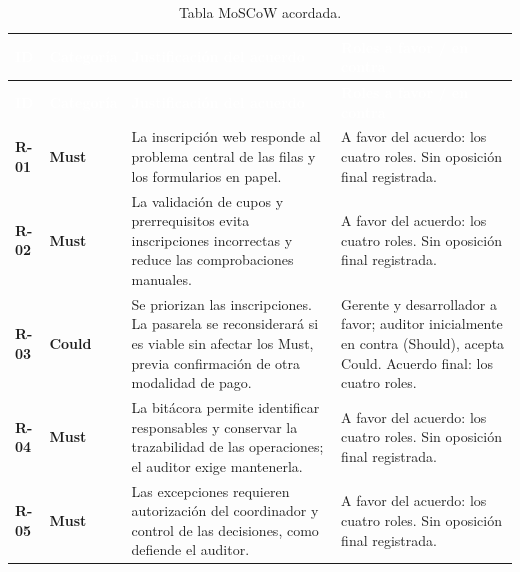 \documentclass[12pt,a4paper]{article}
\newcommand{\cabecera}[1]{
    \textcolor{white}{\textbf{#1}}
}
\begin{document}
\begingroup

\small
\singlespacing
\setlength{\tabcolsep}{4pt}

\begin{longtable}{
    C{1.1cm}
    C{2.0cm}
    L{6.7cm}
    L{4.0cm}
}

\caption{Tabla MoSCoW acordada.}
\label{tab:moscow}\\

\cabecera{ID} &
\cabecera{Categoría} &
\cabecera{Justificación del acuerdo} &
\cabecera{Roles a favor / en contra} \\

\endfirsthead

\cabecera{ID} &
\cabecera{Categoría} &
\cabecera{Justificación del acuerdo} &
\cabecera{Roles a favor / en contra} \\

\endhead

\bottomrule

\endfoot

\textbf{R-01} & \textbf{Must} & La inscripción web responde al problema central de las filas y los formularios en papel. & A favor del acuerdo: los cuatro roles. Sin oposición final registrada. \\

\textbf{R-02} & \textbf{Must} & La validación de cupos y prerrequisitos evita inscripciones incorrectas y reduce las comprobaciones manuales. & A favor del acuerdo: los cuatro roles. Sin oposición final registrada. \\

\textbf{R-03} & \textbf{Could} & Se priorizan las inscripciones. La pasarela se reconsiderará si es viable sin afectar los Must, previa confirmación de otra modalidad de pago. & Gerente y desarrollador a favor; auditor inicialmente en contra (Should), acepta Could. Acuerdo final: los cuatro roles. \\

\textbf{R-04} & \textbf{Must} & La bitácora permite identificar responsables y conservar la trazabilidad de las operaciones; el auditor exige mantenerla. & A favor del acuerdo: los cuatro roles. Sin oposición final registrada. \\

\textbf{R-05} & \textbf{Must} & Las excepciones requieren autorización del coordinador y control de las decisiones, como defiende el auditor. & A favor del acuerdo: los cuatro roles. Sin oposición final registrada. \\


\end{longtable}
\end{document}
